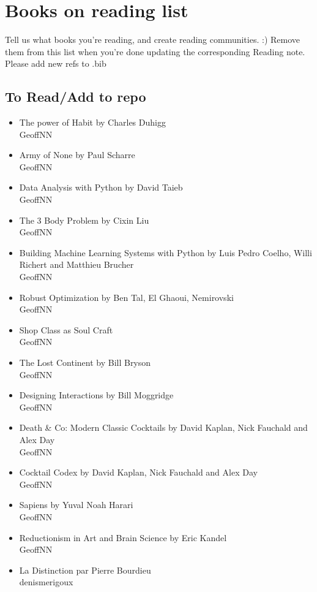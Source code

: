 
\section{Books on reading list}
Tell us what books you're reading, and create reading communities. :) Remove them from this list when you're done updating the corresponding Reading note. Please add new refs to .bib

\subsection{To Read/Add to repo}
\begin{itemize}
    \item The power of Habit by Charles Duhigg\\
    GeoffNN
    \item Army of None by Paul Scharre \\
    GeoffNN
    \item Data Analysis with Python by David Taieb \\
    GeoffNN
    \item The 3 Body Problem by Cixin Liu\\
    GeoffNN
    \item Building Machine Learning Systems with Python by Luis Pedro Coelho, Willi Richert and Matthieu Brucher \\
    GeoffNN
    \item Robust Optimization by Ben Tal, El Ghaoui, Nemirovski \\
    GeoffNN
    \item Shop Class as Soul Craft \\
    GeoffNN
    \item The Lost Continent by Bill Bryson \\
    GeoffNN
    \item Designing Interactions by Bill Moggridge \\
    GeoffNN
    \item Death \& Co: Modern Classic Cocktails by David Kaplan, Nick Fauchald and Alex Day \\
    GeoffNN
    \item Cocktail Codex by David Kaplan, Nick Fauchald and Alex Day \\
    GeoffNN
    \item Sapiens by Yuval Noah Harari \\
    GeoffNN
    \item Reductionism in Art and Brain Science by Eric Kandel \\
    GeoffNN
    \item La Distinction par Pierre Bourdieu \\
    denismerigoux
\end{itemize}
